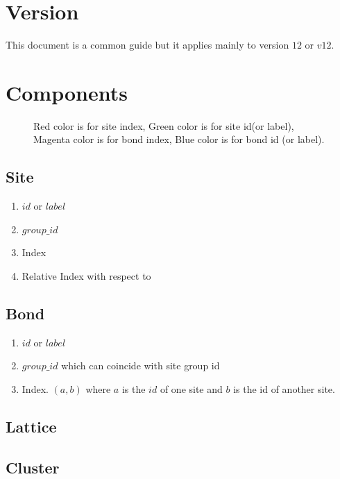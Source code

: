 \documentclass[10pt,a4paper]{report}
\begin{document}
	\chapter{Version}
	This document is a common guide but it applies mainly to version $12$ or $v12$.
	
	\chapter{Components}
	\begin{figure}
		\caption{Red color is for site index, Green color is for site id(or label), Magenta color is for bond index, Blue color is for bond id (or label).}
	\end{figure}
	\section{Site}
	\begin{enumerate}
		\item $id$ or $label$
		\item $group\_id$
		\item Index
		\item Relative Index with respect to 
	\end{enumerate}
	\section{Bond}
\begin{enumerate}
	\item $id$ or $label$
	\item $group\_id$ which can coincide with site group id
	
	\item Index. $(a,b)$ where $a$ is the $id$ of one site and $b$ is the id of another site.
\end{enumerate}
	\section{Lattice}
	\section{Cluster}
\end{document}
